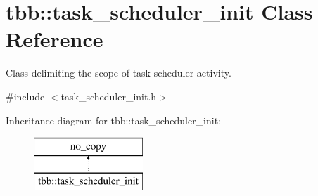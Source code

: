 \hypertarget{classtbb_1_1task__scheduler__init}{}\section{tbb\+:\+:task\+\_\+scheduler\+\_\+init Class Reference}
\label{classtbb_1_1task__scheduler__init}


Class delimiting the scope of task scheduler activity.  




{\ttfamily \#include $<$task\+\_\+scheduler\+\_\+init.\+h$>$}

Inheritance diagram for tbb\+:\+:task\+\_\+scheduler\+\_\+init\+:\begin{figure}[H]
\begin{center}
\leavevmode
\includegraphics[height=2.000000cm]{classtbb_1_1task__scheduler__init}
\end{center}
\end{figure}
